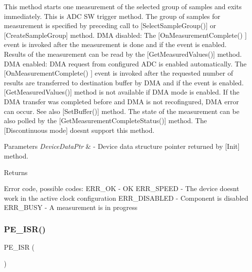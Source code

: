 This method starts one measurement of the selected group of samples and exits immediately. This is A\+DC SW trigger method. The group of samples for measurement is specified by preceding call to \mbox{[}Select\+Sample\+Group()\mbox{]} or \mbox{[}Create\+Sample\+Group\mbox{]} method. D\+MA disabled\+: The \mbox{[}On\+Measurement\+Complete() \mbox{]} event is invoked after the measurement is done and if the event is enabled. Results of the measurement can be read by the \mbox{[}Get\+Measured\+Values()\mbox{]} method. D\+MA enabled\+: D\+MA request from configured A\+DC is enabled automatically. The \mbox{[}On\+Measurement\+Complete() \mbox{]} event is invoked after the requested number of results are transferred to destination buffer by D\+MA and if the event is enabled. \mbox{[}Get\+Measured\+Values()\mbox{]} method is not available if D\+MA mode is enabled. If the D\+MA transfer was completed before and D\+MA is not recofingured, D\+MA error can occur. See also \mbox{[}Set\+Buffer()\mbox{]} method. The state of the measurement can be also polled by the \mbox{[}Get\+Measurement\+Complete\+Status()\mbox{]} method. The \mbox{[}Discontinuous mode\mbox{]} doesn\textquotesingle{}t support this method. 


\begin{DoxyParams}{Parameters}
{\em Device\+Data\+Ptr} & -\/ Device data structure pointer returned by \mbox{[}Init\mbox{]} method. \\
\hline
\end{DoxyParams}
\begin{DoxyReturn}{Returns}

\begin{DoxyItemize}
\item Error code, possible codes\+: E\+R\+R\+\_\+\+OK -\/ OK E\+R\+R\+\_\+\+S\+P\+E\+ED -\/ The device doesn\textquotesingle{}t work in the active clock configuration E\+R\+R\+\_\+\+D\+I\+S\+A\+B\+L\+ED -\/ Component is disabled E\+R\+R\+\_\+\+B\+U\+SY -\/ A measurement is in progress 
\end{DoxyItemize}
\end{DoxyReturn}
\mbox{\label{group___adc_ldd1__module_ga563031e4594799f73a2a64dbdc65ea00}} 
\subsubsection{\texorpdfstring{P\+E\+\_\+\+I\+S\+R()}{PE\_ISR()}}
{\footnotesize\ttfamily P\+E\+\_\+\+I\+SR (\begin{DoxyParamCaption}\item[{Adc\+Ldd1\+\_\+\+Measurement\+Complete\+Interrupt}]{ }\end{DoxyParamCaption})}

